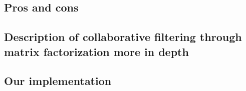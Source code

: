 \subsection{Pros and cons}


\subsection{Description of collaborative filtering through matrix factorization more in depth}

\subsection{Our implementation}
